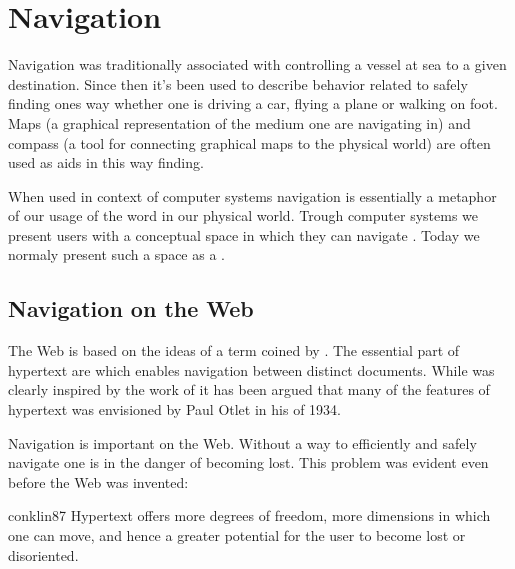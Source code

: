 \section{Navigation}
Navigation was traditionally associated with controlling a vessel at sea to
a given destination.%
Since then it's been used to describe behavior related to safely finding ones
way whether one is driving a car, flying a plane or walking on foot. Maps
(a graphical representation of the medium one are navigating in)
and compass (a tool for connecting graphical maps to the physical world)
are often used as aids in this way finding.

When used in context of
computer systems navigation is essentially a metaphor of our usage of the
word in our physical world. Trough computer systems we present users with a
conceptual space in which they can navigate \citep[p.~189]{whiteside85}.
Today we normaly present such a space as a %
.

\subsection{Navigation on the Web}
\label{section:background.navigation.navigation.on.the.web}

The Web is based on the ideas of \dash{}a term coined by
\citet[p.~86]{nelson65}. The essential part of hypertext are
 \citep[p.~90]{nelson65} which enables navigation between
distinct documents. While \citeauthor{nelson65} was clearly
inspired by the work of \citet{bush45} it has been argued \citep{rayward94}
that many of the features of hypertext was envisioned by Paul Otlet in his
 of 1934.

Navigation is important on the Web. Without a way to efficiently and safely
navigate one is in the danger of becoming lost. This problem was evident even
before the Web was invented:
\begin{citequote}[p.~38]{conklin87}
  Hypertext offers more degrees of freedom, more dimensions in which one
  can move, and hence a greater potential for the user
  to become lost or disoriented.
\end{citequote}

